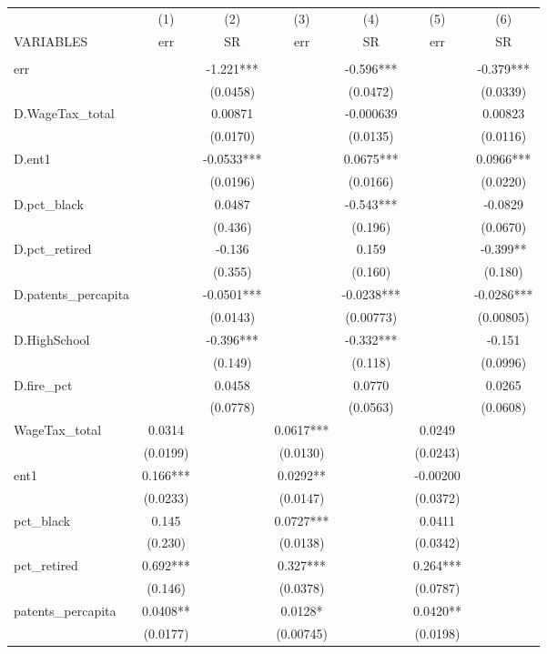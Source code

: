 \begin{tabular}{lcccccc} \hline
 & (1) & (2) & (3) & (4) & (5) & (6) \\
VARIABLES & err & SR & err & SR & err & SR \\ \hline
 &  &  &  &  &  &  \\
err &  & -1.221*** &  & -0.596*** &  & -0.379*** \\
 &  & (0.0458) &  & (0.0472) &  & (0.0339) \\
D.WageTax\_total &  & 0.00871 &  & -0.000639 &  & 0.00823 \\
 &  & (0.0170) &  & (0.0135) &  & (0.0116) \\
D.ent1 &  & -0.0533*** &  & 0.0675*** &  & 0.0966*** \\
 &  & (0.0196) &  & (0.0166) &  & (0.0220) \\
D.pct\_black &  & 0.0487 &  & -0.543*** &  & -0.0829 \\
 &  & (0.436) &  & (0.196) &  & (0.0670) \\
D.pct\_retired &  & -0.136 &  & 0.159 &  & -0.399** \\
 &  & (0.355) &  & (0.160) &  & (0.180) \\
D.patents\_percapita &  & -0.0501*** &  & -0.0238*** &  & -0.0286*** \\
 &  & (0.0143) &  & (0.00773) &  & (0.00805) \\
D.HighSchool &  & -0.396*** &  & -0.332*** &  & -0.151 \\
 &  & (0.149) &  & (0.118) &  & (0.0996) \\
D.fire\_pct &  & 0.0458 &  & 0.0770 &  & 0.0265 \\
 &  & (0.0778) &  & (0.0563) &  & (0.0608) \\
WageTax\_total & 0.0314 &  & 0.0617*** &  & 0.0249 &  \\
 & (0.0199) &  & (0.0130) &  & (0.0243) &  \\
ent1 & 0.166*** &  & 0.0292** &  & -0.00200 &  \\
 & (0.0233) &  & (0.0147) &  & (0.0372) &  \\
pct\_black & 0.145 &  & 0.0727*** &  & 0.0411 &  \\
 & (0.230) &  & (0.0138) &  & (0.0342) &  \\
pct\_retired & 0.692*** &  & 0.327*** &  & 0.264*** &  \\
 & (0.146) &  & (0.0378) &  & (0.0787) &  \\
patents\_percapita & 0.0408** &  & 0.0128* &  & 0.0420** &  \\
 & (0.0177) &  & (0.00745) &  & (0.0198) &  \\

\end{tabular}
